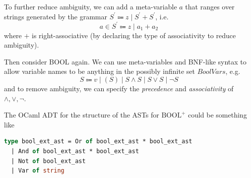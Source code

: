 To further reduce ambiguity, we can add a meta-variable \(a\) that ranges over strings generated by the grammar \(S^{\prime} \Coloneqq z \mid S^{\prime} + S^{\prime}\), i.e.
\[
  a \in S^{\prime} \Coloneqq z \mid a_1 + a_2
\]
where \(+\) is right-associative (by declaring the type of associativity to reduce ambiguity). 

Then consider BOOL again. We can use meta-variables and BNF-like syntax to allow variable names to be anything in the possibly infinite set \(BoolVars\), e.g.
\[
  S \Coloneqq v \mid (S) \mid S \wedge S \mid S \vee S \mid \neg S
\]
and to remove ambiguity, we can specify the \textit{precedence} and \textit{associativity} of \(\wedge, \vee, \neg\). 

The OCaml ADT for the structure of the ASTs for \(\text{BOOL}^+\) could be something like 
\begin{lstlisting}[language=OCaml]
type bool_ext_ast = Or of bool_ext_ast * bool_ext_ast
  | And of bool_ext_ast * bool_ext_ast
  | Not of bool_ext_ast
  | Var of string
\end{lstlisting}